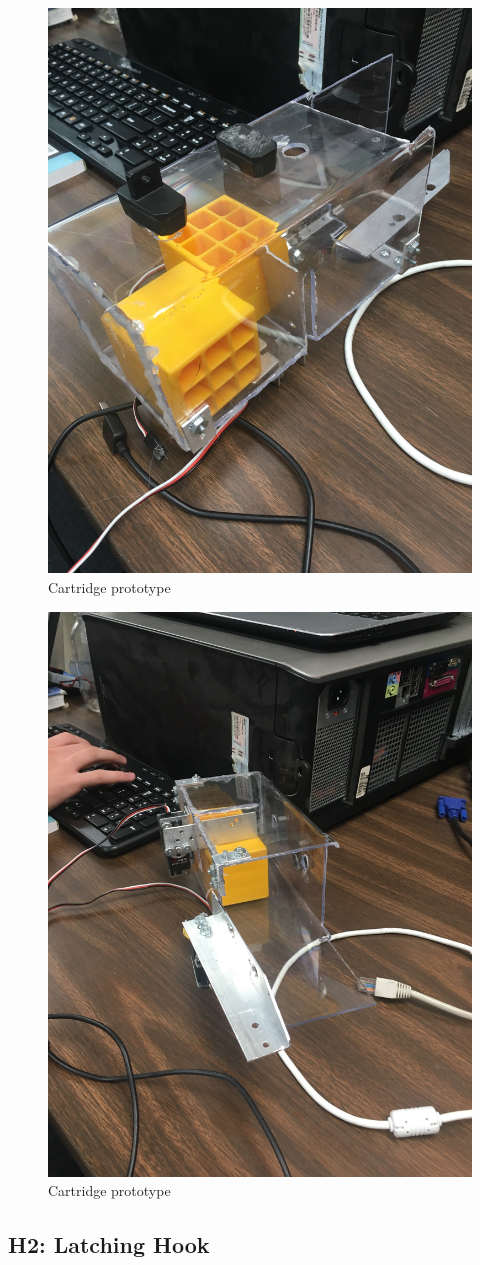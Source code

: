 \documentclass{article}
\begin{document}
\begin{figure}
    \centering
    \includegraphics[width=.6 \textwidth]{14_12-03/images/cartridge1.JPG}
    \caption{Cartridge prototype}
    \label{fig:cartridge}
\end{figure}

\begin{figure}
    \centering
    \includegraphics[width=.6 \textwidth]{14_12-03/images/cartridge3.JPG}
    \caption{Cartridge prototype}
    \label{fig:thing}
\end{figure}

\subsection{H2: Latching Hook}
\end{document}
